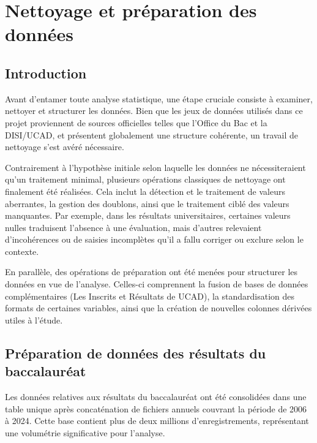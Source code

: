 \chapter{Nettoyage et préparation des données}

\section{Introduction}
Avant d’entamer toute analyse statistique, une étape cruciale consiste à examiner, nettoyer et structurer les données. 
Bien que les jeux de données utilisés dans ce projet proviennent de sources officielles telles que l’Office du Bac et la DISI/UCAD, et présentent globalement une structure cohérente, un travail de nettoyage s’est avéré nécessaire.

Contrairement à l’hypothèse initiale selon laquelle les données ne nécessiteraient qu’un traitement minimal, plusieurs opérations classiques de nettoyage ont finalement été réalisées. 
Cela inclut la détection et le traitement de valeurs aberrantes, la gestion des doublons, ainsi que le traitement ciblé des valeurs manquantes. 
  Par exemple, dans les résultats universitaires, certaines valeurs nulles traduisent l'absence à une évaluation, mais d'autres relevaient d’incohérences ou de saisies incomplètes qu’il a fallu corriger ou exclure selon le contexte.

En parallèle, des opérations de préparation ont été menées pour structurer les données en vue de l’analyse. 
Celles-ci comprennent la fusion de bases de données complémentaires (Les Inscrits et Résultats de UCAD), la standardisation des formats de certaines variables, ainsi que la création de nouvelles colonnes dérivées utiles à l’étude.


\section{Préparation de données des résultats du baccalauréat}

Les données relatives aux résultats du baccalauréat ont été consolidées dans une table unique après concaténation de fichiers annuels couvrant la période de 2006 à 2024. 
Cette base contient plus de deux millions d’enregistrements, représentant une volumétrie significative pour l’analyse.

